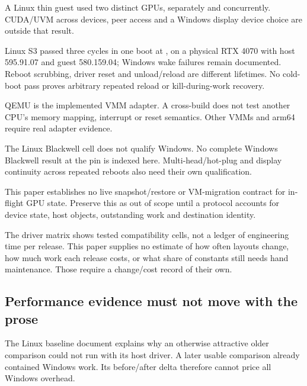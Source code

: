 \begin{description}[itemsep=0.5em]
\item[Several GPUs.] \reported A Linux thin guest used two distinct GPUs, separately and
  concurrently. CUDA/UVM across devices, peer access and a Windows display device choice are
  outside that result.
\item[Suspend and reset.] \reported Linux S3 passed three cycles in one boot at
  , on a physical RTX 4070 with host 595.91.07 and guest 580.159.04; Windows
  wake failures remain documented. Reboot scrubbing, driver reset and unload/reload are
  different lifetimes. No cold-boot pass proves arbitrary repeated reload or kill-during-work
  recovery.
\item[Other hosts.] \doc QEMU is the implemented VMM adapter. A cross-build does not test
  another CPU's memory mapping, interrupt or reset semantics. Other VMMs and arm64 require
  real adapter evidence.
\item[Windows breadth.] \unverified The Linux Blackwell cell does not qualify Windows.
  No complete Windows Blackwell result at the pin is indexed here. Multi-head/hot-plug and
  display continuity across repeated reboots also need their own qualification.
\item[Snapshot and migration.] \unverified This paper establishes no live snapshot/restore
  or VM-migration contract for in-flight GPU state. Preserve this as out of scope until a
  protocol accounts for device state, host objects, outstanding work and destination identity.
\item[Driver-release cost.] \unmeasured The driver matrix shows tested compatibility cells,
  not a ledger of engineering time per release. This paper supplies no estimate of how often
  layouts change, how much work each release costs, or what share of constants still needs
  hand maintenance. Those require a change/cost record of their own.
\end{description}

\subsection{Performance evidence must not move with the prose}

\doc The Linux baseline document explains why an otherwise attractive older comparison
could not run with its host driver. A later usable comparison already contained Windows work.
Its before/after delta therefore cannot price all Windows overhead.

